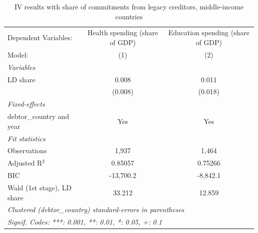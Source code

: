 
\begin{table}[htbp]
   \caption{\label{tab:iv_commit_other} IV results with share of commitments from legacy creditors, middle-income countries}
   \centering
   \begin{tabular}{lcc}
      \tabularnewline \midrule \midrule
      Dependent Variables:       & Health spending (share of GDP) & Education spending (share of GDP)\\  
      Model:                     & (1)                            & (2)\\  
      \midrule
      \emph{Variables}\\
      LD share                   & 0.008                          & 0.011\\   
                                 & (0.008)                        & (0.018)\\   
      \midrule
      \emph{Fixed-effects}\\
      debtor\_country and year   & Yes                            & Yes\\  
      \midrule
      \emph{Fit statistics}\\
      Observations               & 1,937                          & 1,464\\  
      Adjusted R$^2$             & 0.85057                        & 0.75266\\  
      BIC                        & -13,700.2                      & -8,842.1\\  
      Wald (1st stage), LD share & 33.212                         & 12.859\\  
      \midrule \midrule
      \multicolumn{3}{l}{\emph{Clustered (debtor\_country) standard-errors in parentheses}}\\
      \multicolumn{3}{l}{\emph{Signif. Codes: ***: 0.001, **: 0.01, *: 0.05, +: 0.1}}\\
   \end{tabular}
\end{table}


